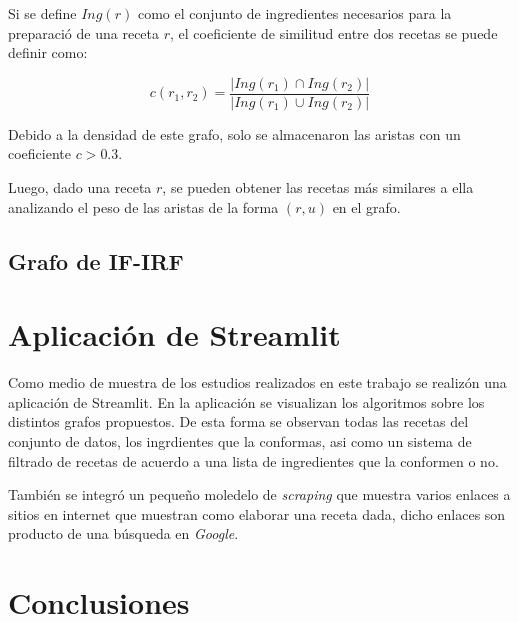 \documentclass[a4paper]{article}
\begin{document}
Si se define $Ing(r)$ como el conjunto de ingredientes necesarios para la preparació
de una receta $r$, el coeficiente de similitud entre dos recetas se puede definir como:

$$ c(r_1, r_2) = \frac{|Ing(r_1) \cap Ing(r_2)|}{|Ing(r_1) \cup Ing(r_2)|}$$

Debido a la densidad de este grafo, solo se almacenaron las aristas con un 
coeficiente $c > 0.3$.

Luego, dado una receta $r$, se pueden obtener las recetas más similares a ella
analizando el peso de las aristas de la forma $(r, u)$ en el grafo.

\subsection{Grafo de IF-IRF}\label{sub:sim-graph}

\section{Aplicación de Streamlit}\label{sec:app}

Como medio de muestra de los estudios realizados en este trabajo se realizón
una aplicación de Streamlit. En la aplicación se visualizan los algoritmos sobre
los distintos grafos propuestos. De esta forma se observan todas las recetas del
conjunto de datos, los ingrdientes que la conformas, asi como un sistema de
filtrado de recetas de acuerdo a una lista de ingredientes que la conformen o no.

También se integró un pequeño moledelo de \emph{scraping} que muestra varios
enlaces a sitios en internet que muestran como elaborar una receta dada, dicho
enlaces son producto de una búsqueda en \emph{Google}.

\section{Conclusiones}\label{sec:conc}
\end{document}

